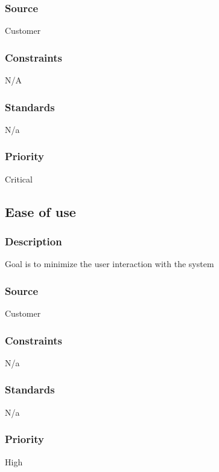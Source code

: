 \subsubsection{Source}
Customer
\subsubsection{Constraints}
N/A
\subsubsection{Standards}
N/a
\subsubsection{Priority}
Critical

\subsection{Ease of use}
\subsubsection{Description}
Goal is to minimize the user interaction with the system
\subsubsection{Source}
Customer
\subsubsection{Constraints}
N/a
\subsubsection{Standards}
N/a
\subsubsection{Priority}
High